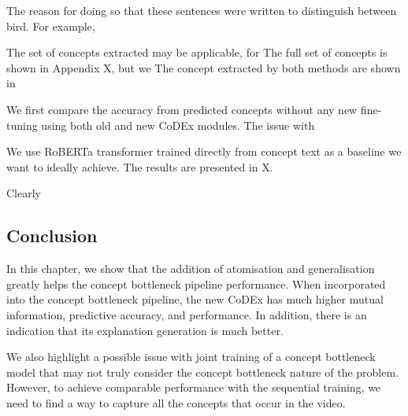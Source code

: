 The reason for doing so that these sentences were written to distinguish between bird.
For example, 

The set of concepts extracted may be applicable, for 
The full set of concepts is shown in Appendix X, but we 
The concept extracted by both methods are shown in 

We first compare the accuracy from predicted concepts without any new fine-tuning using both old and new CoDEx modules.
The issue with 

We use RoBERTa transformer trained directly from concept text as a baseline we want to ideally achieve.
The results are presented in X.


Clearly 







\subsection{Conclusion}

In this chapter, we show that the addition of atomisation and generalisation greatly helps the concept bottleneck pipeline performance.
When incorporated into the concept bottleneck pipeline, the new CoDEx has much higher mutual information,  predictive accuracy, and performance.
In addition, there is an indication that its explanation generation is much better.

We also highlight a possible issue with joint training of a concept bottleneck model that may not truly consider the concept bottleneck nature of the problem.
However, to achieve comparable performance with the sequential training, we need to find a way to capture all the concepts that occur in the video.
